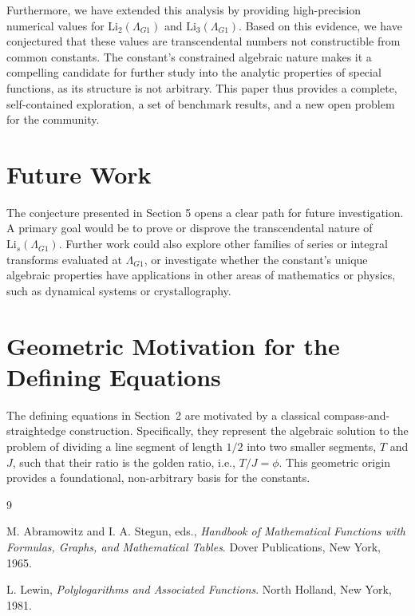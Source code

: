 \documentclass{amsart}
\theoremstyle{plain}
\theoremstyle{definition}
\theoremstyle{remark}
\newcommand{\LambdaG}{\Lambda_{G1}}
\begin{document}
Furthermore, we have extended this analysis by providing high-precision numerical values for $\mathrm{Li}_2(\LambdaG)$ and $\mathrm{Li}_3(\LambdaG)$. Based on this evidence, we have conjectured that these values are transcendental numbers not constructible from common constants. The constant's constrained algebraic nature makes it a compelling candidate for further study into the analytic properties of special functions, as its structure is not arbitrary. This paper thus provides a complete, self-contained exploration, a set of benchmark results, and a new open problem for the community.

\section{Future Work}
The conjecture presented in Section 5 opens a clear path for future investigation. A primary goal would be to prove or disprove the transcendental nature of $\mathrm{Li}_s(\LambdaG)$. Further work could also explore other families of series or integral transforms evaluated at $\LambdaG$, or investigate whether the constant's unique algebraic properties have applications in other areas of mathematics or physics, such as dynamical systems or crystallography.

\appendix
\section{Geometric Motivation for the Defining Equations}
\label{app:A}
The defining equations in Section~2 are motivated by a classical compass-and-straightedge construction. Specifically, they represent the algebraic solution to the problem of dividing a line segment of length $1/2$ into two smaller segments, $T$ and $J$, such that their ratio is the golden ratio, i.e., $T/J = \phi$. This geometric origin provides a foundational, non-arbitrary basis for the constants.

\begin{thebibliography}{9}

M. Abramowitz and I. A. Stegun, eds.,
\textit{Handbook of Mathematical Functions with Formulas, Graphs, and Mathematical Tables}.
Dover Publications, New York, 1965.

L. Lewin,
\textit{Polylogarithms and Associated Functions}.
North Holland, New York, 1981.

\end{thebibliography}
\end{document}
